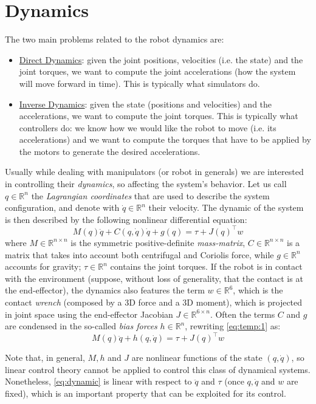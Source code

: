             
\section{Dynamics}
                The two main problems related to the robot dynamics are:
                \begin{itemize}
                    \item \underline{Direct Dynamics}: given the joint positions, velocities (i.e. the state) and the joint torques, we want to compute the joint accelerations (how the system will move forward in time). This is typically what simulators do.
                    \item \underline{Inverse Dynamics}: given the state (positions and velocities) and the accelerations, we want to compute the joint torques. This is typically what controllers do: we know how we would like the robot to move (i.e. its accelerations) and we want to compute the torques that have to be applied by the motors to generate the desired accelerations. 
                \end{itemize}
                
	Usually while dealing with manipulators (or robot in generals) we are interested in controlling their \textit{dynamics}, so affecting the system's behavior. Let us call $q \in \mathds R^n$ the \textit{Lagrangian coordinates} that are used to describe the system configuration, and denote with $\dot q \in \mathds R^n$ their velocity. The dynamic of the system is then described by the following nonlinear differential equation:
	\begin{equation} \label{eq:temp:1}
		M(q) \ddot q + C(q,\dot q) \dot q + g(q) = \tau + J(q)^\top w
	\end{equation}
	where $M\in \mathds R^{n\times n}$ is the symmetric positive-definite \textit{mass-matrix}, $C \in \mathds R^{n\times n}$ is a matrix that takes into account both centrifugal and Coriolis force, while $g \in \mathds R^n$ accounts for gravity; $\tau \in \mathds R^n$ contains the joint torques.
	If the robot is in contact with the environment (suppose, without loss of generality, that the contact is at the end-effector), the dynamics also features the term $w \in \mathds R^6$, which is the contact \textit{wrench} (composed by a 3D force and a 3D moment), which is projected in joint space using the end-effector Jacobian $J \in \mathds R^{6 \times n}$. 
	Often the terms $C$ and $g$ are condensed in the so-called \textit{bias forces} $h \in \mathds R^n$, rewriting \eqref{eq:temp:1} as:
	\begin{equation} \label{eq:dynamic}
		M(q) \ddot q + h(q,\dot q) = \tau + J(q)^\top w
	\end{equation}

	Note that, in general, $M, h$ and $J$ are nonlinear functions of the state $(q,\dot q)$, so linear control theory cannot be applied to control this class of dynamical systems. 
	Nonetheless, \eqref{eq:dynamic} is linear with respect to $\ddot q$ and $\tau$ (once $q,\dot q$ and $w$ are fixed), which is an important property that can be exploited for its control.
